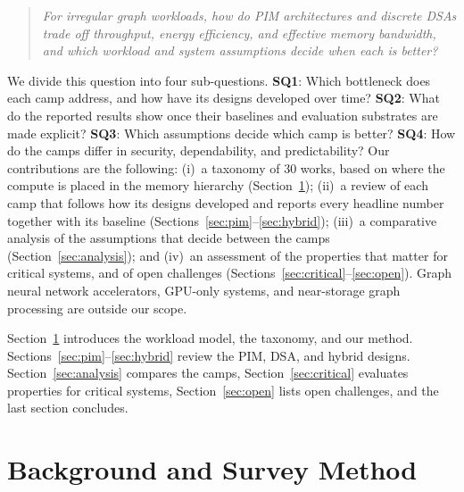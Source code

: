 \documentclass[journal,onecolumn]{IEEEtran}
\begin{document}
\begin{quote}\itshape
For irregular graph workloads, how do PIM architectures and discrete DSAs trade off throughput, energy efficiency, and effective memory bandwidth, and which workload and system assumptions decide when each is better?
\end{quote}

We divide this question into four sub-questions. \textbf{SQ1}: Which bottleneck does each camp address, and how have its designs developed over time? \textbf{SQ2}: What do the reported results show once their baselines and evaluation substrates are made explicit? \textbf{SQ3}: Which assumptions decide which camp is better? \textbf{SQ4}: How do the camps differ in security, dependability, and predictability? Our contributions are the following:
(i)~a taxonomy of 30 works, based on where the compute is placed in the memory hierarchy (Section~\ref{sec:background});
(ii)~a review of each camp that follows how its designs developed and reports every headline number together with its baseline (Sections~\ref{sec:pim}--\ref{sec:hybrid});
(iii)~a comparative analysis of the assumptions that decide between the camps (Section~\ref{sec:analysis});
and (iv)~an assessment of the properties that matter for critical systems, and of open challenges (Sections~\ref{sec:critical}--\ref{sec:open}).
Graph neural network accelerators, GPU-only systems, and near-storage graph processing are outside our scope.

Section~\ref{sec:background} introduces the workload model, the taxonomy, and our method. Sections~\ref{sec:pim}--\ref{sec:hybrid} review the PIM, DSA, and hybrid designs. Section~\ref{sec:analysis} compares the camps, Section~\ref{sec:critical} evaluates properties for critical systems, Section~\ref{sec:open} lists open challenges, and the last section concludes.

\section{Background and Survey Method}\label{sec:background}
\end{document}
